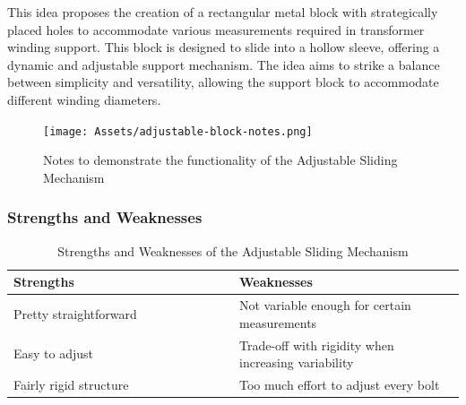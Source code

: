 \documentclass[a4paper,10pt]{article}
\begin{document}
This idea proposes the creation of a rectangular metal block with strategically placed holes to accommodate various measurements required in transformer winding support. This block is designed to slide into a hollow sleeve, offering a dynamic and adjustable support mechanism. The idea aims to strike a balance between simplicity and versatility, allowing the support block to accommodate different winding diameters.

\begin{figure}[H]
  \centering
  \texttt{[image: Assets/adjustable-block-notes.png]}
  \caption{Notes to demonstrate the functionality of the Adjustable Sliding Mechanism}
  \label{fig:adjustable-block-notes}
\end{figure}

\subsubsection{Strengths and Weaknesses}

\begin{table}[h]
  \centering
  \begin{tabular}{p{0.5\linewidth} | p{0.5\linewidth}}
    Strengths                                              & Weaknesses \\ \hline
    \textbullet{} Pretty straightforward                   & \textbullet{} Not variable enough for certain measurements \\
    \textbullet{} Easy to adjust                           & \textbullet{} Trade-off with rigidity when increasing variability \\
    \textbullet{} Fairly rigid structure                   & \textbullet{} Too much effort to adjust every bolt \\
  \end{tabular}
  \caption{Strengths and Weaknesses of the Adjustable Sliding Mechanism}
  \label{table:adjustable-block-pros-cons}
\end{table}

\section{}


\pagebreak
\printglossaries
\end{document}

